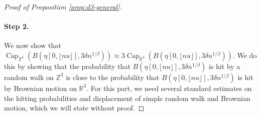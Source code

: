 \documentclass{article}
\DeclareMathOperator{\Ca}{Cap}
\newcommand{\R}{\mathbb{R}}
\newcommand{\Z}{\mathbb{Z}}
\renewcommand{\P}{\mathbb{P}}
\newcommand{\1}{\mathbf{1}}
\theoremstyle{definition}
\numberwithin{equation}{section}
\numberwithin{theorem}{section}
\begin{document}
\begin{proof}[Proof of Proposition \ref{prop:d3-general}]

\paragraph{Step 2.}
We now show that $\Ca_{\Z^3}(B(\eta[0,\lfloor nu\rfloor],3\delta n^{1/\beta}))\approx3\Ca_{\R^3}(B(\eta[0,\lfloor nu\rfloor],3\delta n^{1/\beta}))$. We do this by showing that the probability that $B(\eta[0,\lfloor nu\rfloor],3\delta n^{1/\beta})$ is hit by a random walk on $\Z^3$ is close to the probability that $B(\eta[0,\lfloor nu\rfloor],3\delta n^{1/\beta})$ is hit by Brownian motion on $\R^3$. For this part, we need several standard estimates on the hitting probabilities and displacement of simple random walk and Brownian motion, which we will state without proof.


\end{proof}
\end{document}

